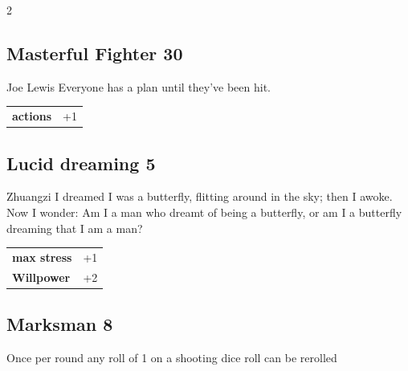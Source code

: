 \begin{multicols}{2}
\begin{tcolorbox}
    \subsection*{Masterful Fighter \hfill \small{30 }}
    \tcblower


\begin{pquote}{Joe Lewis}
Everyone has a plan until they’ve been hit.
\end{pquote}

\vspace{3mm}

\begin{tabular}{@{}ll@{}}
    \textbf{actions} & +1\\
\end{tabular}


\end{tcolorbox}

\begin{tcolorbox}
    \subsection*{Lucid dreaming \hfill \small{5 }}
    \tcblower


\begin{pquote}{Zhuangzi}
I dreamed I was a butterfly, flitting around in the sky; then I awoke. Now I wonder: Am I a man who dreamt of being a butterfly, or am I a butterfly dreaming that I am a man?
\end{pquote}

\vspace{3mm}

\begin{tabular}{@{}ll@{}}
    \textbf{max stress} & +1\\
    \textbf{Willpower} & +2\\
\end{tabular}


\end{tcolorbox}

\begin{tcolorbox}
    \subsection*{Marksman \hfill \small{8 }}
    \tcblower
Once per round any roll of 1 on a shooting dice roll can be rerolled


\end{tcolorbox}
\end{multicols}
